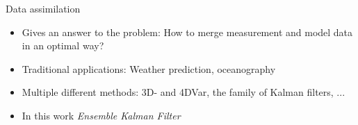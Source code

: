 \documentclass{beamer}
\begin{document}

\begin{frame}{Data assimilation}

\begin{itemize}
\item Gives an answer to the problem: How to merge measurement and model data in an optimal way?
\item Traditional applications: Weather prediction, oceanography
\item Multiple different methods: 3D- and 4DVar, the family of Kalman filters, ...
\item In this work \emph{Ensemble Kalman Filter}
\end{itemize}

\end{frame}


\end{document}
